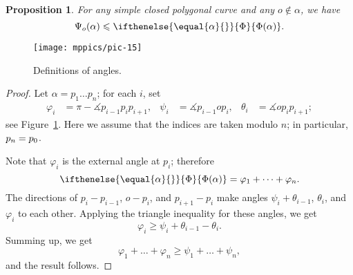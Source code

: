 \documentclass{article}
\newcommand*{\arXiv}[2]{#1} %
\newcommand*{\z}[1]{#1\nobreak\discretionary{}%
            {\hbox{$\mathsurround=0pt #1$}}{}}
\theoremstyle{theorem}
\newtheorem{Proposition}[theorem]{Proposition}
\newtheorem{Crofton-type formula}[theorem]{Crofton-type formula}
\newtheorem{Douglas--Rado theorem}[theorem]{\arXiv{Douglas--Rado theorem}{Theorem}}
\newtheorem{Extended monotonicity theorem}[theorem]{\arXiv{Extended monotonicity theorem}{Theorem}}
\theoremstyle{definition}
\newcommand*{\tc}[1]{\ifthenelse{\equal{#1}{}}{\Phi}{\Phi({#1})}}%
\def\phi{\varphi}
\def\ge{\geqslant}
\def\le{\leqslant}
\begin{document}
\begin{Proposition}\label{prop:angular-length}
For any simple closed polygonal curve and any $o\notin\alpha$, we have 
\[\Psi_o(\alpha)\le \tc{\alpha}.\]
\end{Proposition}

\begin{figure}[!ht]
\vskip-0mm
\centering
\arXiv{\texttt{[image: mppics/pic-15]}}{\texttt{[image: pic-15]}}
\caption{Definitions of angles.}
\label{fig4}
\vskip0mm
\end{figure}

\begin{proof}
Let $\alpha=p_1\dots p_n$; for each $i$, set 
\begin{align*}
\phi_i&=\pi-\measuredangle p_{i-1}p_ip_{i+1},
&
\psi_i&=\measuredangle p_{i-1} o p_{i},
&
\theta_i&=\measuredangle o p_i p_{i+1};
\end{align*}
see Figure~\ref{fig4}.
Here we assume that the indices are taken modulo $n$; in particular, $p_{n}\z=p_0$.

Note that $\phi_i$ is the external angle at $p_i$;
therefore 
\[\tc\alpha= \phi_1+\dots+\phi_n.\]
The directions of $p_i-p_{i-1}$, $o-p_i$, and $p_{i+1}-p_i$ make angles 
$\psi_i+\theta_{i-1}$, $\theta_i$, and $\phi_i$ to each other.
Applying the triangle inequality for these angles, we get
\[\phi_i\ge \psi_i+\theta_{i-1}-\theta_i.\]
Summing up, we get
\[\phi_1+\dots+\phi_n\ge \psi_1+\dots+\psi_n,\]
and the result follows.
\end{proof}
\end{document}
